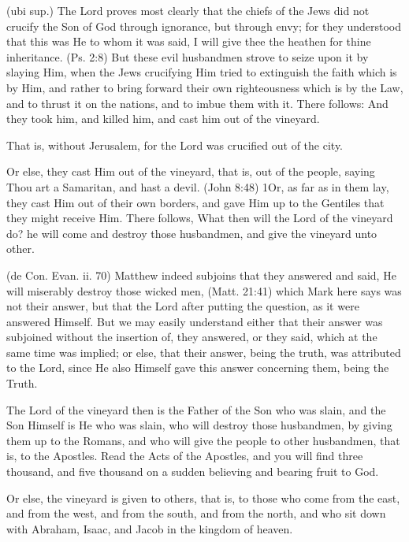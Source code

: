 (ubi sup.) The Lord proves most clearly that the chiefs of the Jews did not crucify the Son of God through ignorance, but through envy; for they understood that this was He to whom it was said, I will give thee the heathen for thine inheritance. (Ps. 2:8) But these evil husbandmen strove to seize upon it by slaying Him, when the Jews crucifying Him tried to extinguish the faith which is by Him, and rather to bring forward their own righteousness which is by the Law, and to thrust it on the nations, and to imbue them with it. There follows: And they took him, and killed him, and cast him out of the vineyard.

 That is, without Jerusalem, for the Lord was crucified out of the city.

 Or else, they cast Him out of the vineyard, that is, out of the people, saying Thou art a Samaritan, and hast a devil. (John 8:48) 1Or, as far as in them lay, they cast Him out of their own borders, and gave Him up to the Gentiles that they might receive Him. There follows, What then will the Lord of the vineyard do? he will come and destroy those husbandmen, and give the vineyard unto other.

 (de Con. Evan. ii. 70) Matthew indeed subjoins that they answered and said, He will miserably destroy those wicked men, (Matt. 21:41) which Mark here says was not their answer, but that the Lord after putting the question, as it were answered Himself. But we may easily understand either that their answer was subjoined without the insertion of, they answered, or they said, which at the same time was implied; or else, that their answer, being the truth, was attributed to the Lord, since He also Himself gave this answer concerning them, being the Truth.

 The Lord of the vineyard then is the Father of the Son who was slain, and the Son Himself is He who was slain, who will destroy those husbandmen, by giving them up to the Romans, and who will give the people to other husbandmen, that is, to the Apostles. Read the Acts of the Apostles, and you will find three thousand, and five thousand on a sudden believing and bearing fruit to God.

 Or else, the vineyard is given to others, that is, to those who come from the east, and from the west, and from the south, and from the north, and who sit down with Abraham, Isaac, and Jacob in the kingdom of heaven.

